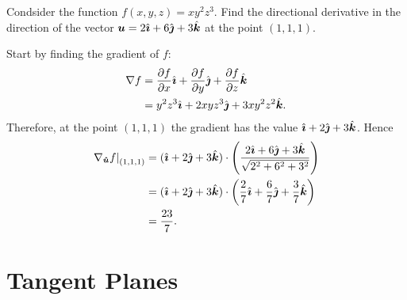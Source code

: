\documentclass[../multivariate_calculus.tex]{subfiles}
\begin{document}
        \begin{example}
            Condsider the function $f(x,y,z)=xy^2z^3$.
            Find the directional derivative in the direction of the vector $\boldsymbol{u}=2\hat{\boldsymbol{\imath}}+6\hat{\boldsymbol{\jmath}}+3\hat{\boldsymbol{k}}$ at the point $(1,1,1)$.
            
            Start by finding the gradient of $f$:
            \begin{align}
                \nabla f&=\pdv{f}{x}\ihat+\pdv{f}{y}\jhat+\pdv{f}{z}\khat\\
                &=y^2z^3\ihat+2xyz^3\jhat+3xy^2z^2\khat.
            \end{align}
            Therefore, at the point $(1,1,1)$ the gradient has the value $\hat{\boldsymbol{\imath}}+2\hat{\boldsymbol{\jmath}}+3\hat{\boldsymbol{k}}$.
            Hence
            \begin{align}
                \left.\nabla_{\boldsymbol{\hat{u}}}f\right|_{(1,1,1)}&=(\hat{\boldsymbol{\imath}}+2\hat{\boldsymbol{\jmath}}+3\hat{\boldsymbol{k}})\cdot\left(\frac{2\hat{\boldsymbol{\imath}}+6\hat{\boldsymbol{\jmath}}+3\hat{\boldsymbol{k}}}{\sqrt{2^2+6^2+3^2}}\right)\\
                &=(\hat{\boldsymbol{\imath}}+2\hat{\boldsymbol{\jmath}}+3\hat{\boldsymbol{k}})\cdot\left(\frac{2}{7}\hat{\boldsymbol{\imath}}+\frac{6}{7}\hat{\boldsymbol{\jmath}}+\frac{3}{7}\hat{\boldsymbol{k}}\right)\\
                &=\frac{23}{7}.
            \end{align}
        \end{example}
    
    \section{Tangent Planes}
\end{document}
